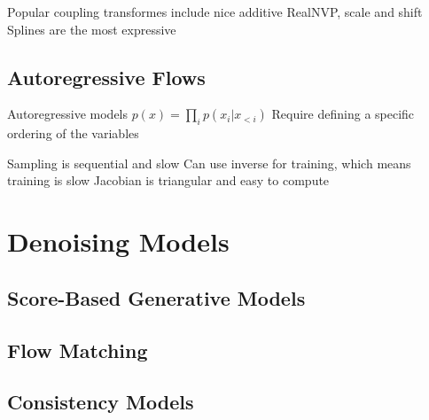Popular coupling transformes include nice additive
RealNVP, scale and shift
Splines are the most expressive

\subsection{Autoregressive Flows}

Autoregressive models $p(x) = \prod_i p(x_i | x_{<i})$
Require defining a specific ordering of the variables

Sampling is sequential and slow
Can use inverse for training, which means training is slow
Jacobian is triangular and easy to compute


\section{Denoising Models}



\subsection{Score-Based Generative Models}

\subsection{Flow Matching}

\subsection{Consistency Models}

